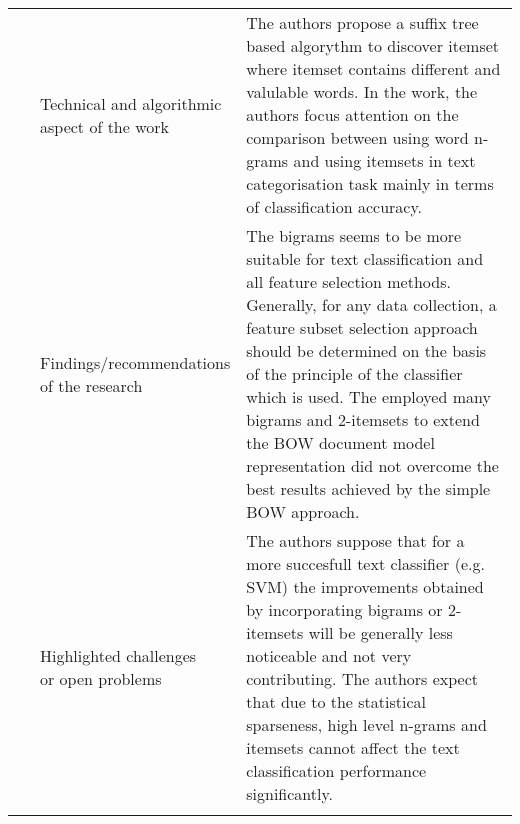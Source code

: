 \begin{landscape}
\begin{longtable}{lp{}p{}}
	\multirow{3}[0]{*}{~\citep{Tesar2006}} & 
    \specialcell{Technical and algorithmic \\ aspect of the work} &
    The authors propose a suffix tree based algorythm to discover itemset where itemset contains different and valulable words. In the work, the authors focus attention on the comparison between using word n-grams and using itemsets in text categorisation task mainly in terms of classification accuracy.     
    \\ & 
    \specialcell{Findings/recommendations \\ of the research} & 
	The bigrams seems to be more suitable for text classification and all feature selection methods. Generally, for any data collection, a feature subset selection approach should be determined on the basis of the principle of the classifier which is used. The employed many bigrams and 2-itemsets to extend the BOW document model representation did not overcome the best results achieved by the simple BOW approach.
    \\ & 
    \specialcell{Highlighted challenges \\ or open problems} & 
    The authors suppose that for a more succesfull text classifier (e.g. SVM) the improvements obtained by incorporating bigrams or 2-itemsets will be generally less noticeable and not very contributing. The authors expect that due to the statistical sparseness, high level n-grams and itemsets cannot affect the text classification performance significantly.
	\\

    \hline
     \label{tab:fsm}
    \end{longtable}%
\end{landscape}